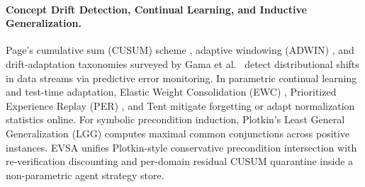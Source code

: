 \documentclass[10pt,letterpaper]{article}
\begin{document}
\paragraph{Concept Drift Detection, Continual Learning, and Inductive Generalization.}
Page's cumulative sum (CUSUM) scheme \cite{page1954continuous}, adaptive windowing (ADWIN) \cite{bifet2007learning}, and drift-adaptation taxonomies surveyed by Gama et al.\ \cite{gama2014survey} detect distributional shifts in data streams via predictive error monitoring. In parametric continual learning and test-time adaptation, Elastic Weight Consolidation (EWC) \cite{kirkpatrick2017overcoming}, Prioritized Experience Replay (PER) \cite{schaul2016prioritized}, and Tent \cite{wang2021tent} mitigate forgetting or adapt normalization statistics online. For symbolic precondition induction, Plotkin's Least General Generalization (LGG) \cite{plotkin1970inductive} computes maximal common conjunctions across positive instances. EVSA unifies Plotkin-style conservative precondition intersection with re-verification discounting and per-domain residual CUSUM quarantine inside a non-parametric agent strategy store.
\end{document}
